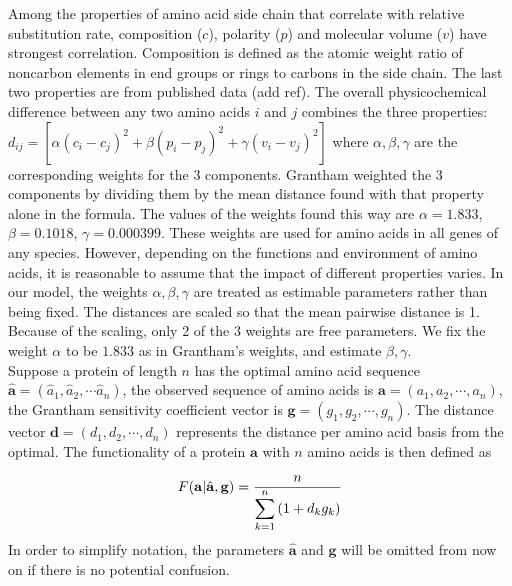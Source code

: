 \documentclass[13pt]{article}
\begin{document}
Among the properties of amino acid side chain that correlate with relative substitution rate, composition ($c$), polarity ($p$) and molecular volume ($v$) have strongest correlation. Composition is defined as the atomic weight ratio of noncarbon elements in end groups or rings to carbons in the side chain. The last two properties are from published data (add ref). The overall physicochemical difference between any two amino acids $i$ and $j$ combines the three properties: $d_{ij} = [\alpha (c_i-c_j)^2 + \beta (p_i - p_j)^2 + \gamma (v_i - v_j)^2]$ where $\alpha, \beta, \gamma$ are the corresponding weights for the 3 components. Grantham weighted the 3 components by dividing them by the mean distance found with that property alone in the formula. The values of the weights found this way are $\alpha = 1.833$, $\beta = 0.1018$, $\gamma = 0.000399$. These weights are used for amino acids in all genes of any species. However, depending on the functions and environment of amino acids, it is reasonable to assume that the impact of different properties varies. In our model, the weights $\alpha, \beta, \gamma$ are treated as estimable parameters rather than being fixed. The distances are scaled so that the mean pairwise distance is 1. Because of the scaling, only 2 of the 3 weights are free parameters. We fix the weight $\alpha$ to be $1.833$ as in Grantham's weights, and estimate $\beta, \gamma$. \\

Suppose a protein of length $n$ has the optimal amino acid sequence $\hat{\mathbf{a}} = (\hat{a}_1, \hat{a}_2, \cdots \hat{a}_n)$, the observed sequence of amino acids is $\mathbf{a} = (a_1, a_2, \cdots, a_n)$, the Grantham sensitivity coefficient vector is  $\mathbf{g}=(g_1,g_2,\cdots,g_n)$.
The distance vector $\mathbf{d} = (d_1, d_2, \cdots, d_n)$ represents the distance per amino acid basis from the optimal. The functionality of a protein $\mathbf{a}$ with $n$ amino acids is then defined as

\begin{equation}
F(\mathbf{a}| \hat{\mathbf{a}},\mathbf{g})  =  \frac{n}{\displaystyle  \sum_{k=1}^n{(1+d_kg_k)}} \label{eq:harmonic}\\
\end{equation}
In order to simplify notation, the parameters $\hat{\mathbf{a}}$ and $\mathbf{g}$ will be omitted from now on if there is no potential confusion.\\
\end{document}

